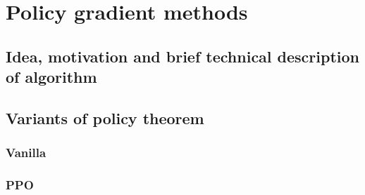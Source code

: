 \chapter{Policy gradient methods}

\section{Idea, motivation and brief technical description of algorithm}

\section{Variants of policy theorem}
\subsection*{Vanilla}
\subsection*{PPO}

